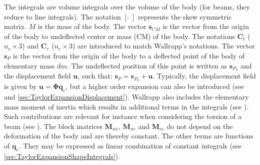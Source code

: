 \documentclass[wes, manuscript]{copernicus}
\renewcommand{\d}{\mathrm{d}}
\renewcommand{\v}[1]{\boldsymbol{#1}}
\newcommand{\m}[1]{\boldsymbol{#1}}
\newcommand{\M} {{\m{M}}}
\newcommand{\s}{\v{s}}
\renewcommand{\d}{\mathrm{d}}
\newcommand{\dm}{\d{m}}
\begin{document}
The integrals are volume integrals over the volume of the body (for beams, they reduce to line integrals).
    The notation $[\tilde{\ \ }]$ represents the skew symmetric matrix.
    $M$ is the mass of the body. 
The vector $\v{s}_{CM}$ is the vector from the origin of the body to undeflected center or mass (CM) of the body.
The notations $\m{C}_t$ ($n_e\times 3$) and $\m{C}_r$ ($n_e\times 3$) are introduced to match Wallrapp's notations.
The vector $\s_{P}$ is the vector from the origin of the body to a deflected point of the body of elementary mass $\dm$.
The undeflected position of this point is written as $\s_{P_0}$ and the displacement field $\v{u}$, such that:  $\s_{P}=\s_{P_0} + \v{u}$.
Typically, the displacement field is given by $\v{u}=\m{\Phi} \v{q}_e$, but a higher order expansion can also be introduced (see \cite{Wallrapp:1994}  and \autoref{sec:TaylorExpansionDisplacement}).
Wallrapp also includes the elementary mass moment of inertia which results in additional terms in the integrals (see \cite{Wallrapp:1994}).
Such contributions are relevant for instance when considering the torsion of a beam (see \cite{branlard:2019flex}).
The block matrices $\M_{xx}$, $\M_{xe}$ and $\M_{ee}$ do not depend on the deformation of the body and are thereby constant.
The other terms are functions of $\v{q}_e$.
They may be expressed as linear combination of constant integrals (see \autoref{sec:TaylorExpansionShapeIntegrals}).
\end{document}
